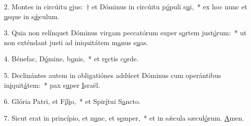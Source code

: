 2. Montes in circúitu \uline{e}jus:~† et Dóminus in circúitu p\uline{ó}puli s\uline{u}i,~* ex hoc nunc et \uline{u}sque in s\uline{ǽ}culum.\par 
3. Quia non relínquet Dóminus virgam peccatórum super s\uline{o}rtem just\uline{ó}rum:~* ut non exténdant justi ad iniquitátem m\uline{a}nus s\uline{u}as.\par 
4. Bénefac, D\uline{ó}mine, b\uline{o}nis,~* et r\uline{e}ctis c\uline{o}rde.\par 
5. Declinántes autem in obligatiónes addúcet Dóminus cum operántibus in\uline{i}quit\uline{á}tem:~* pax s\uline{u}per \uline{I}sraël.\par 
6. Glória Patri, et F\uline{í}l\uline{i}o,~* et Spir\uline{í}tui S\uline{a}ncto.\par 
7. Sicut erat in princípio, et n\uline{u}nc, et s\uline{e}mper,~* et in sǽcula sæcul\uline{ó}rum. \uline{A}men.\par 
